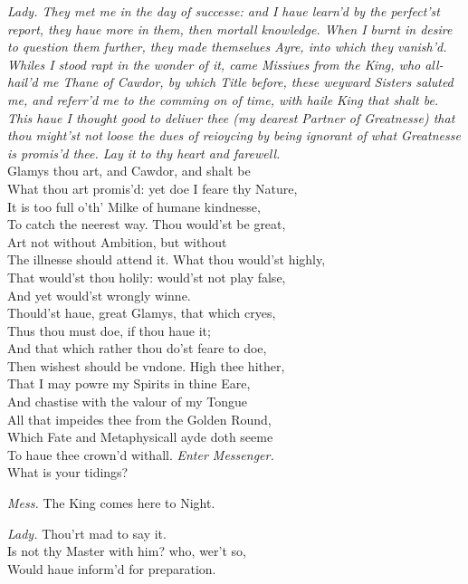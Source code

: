 \documentclass[12pt]{sides}
\newcommand{\clStageDir}[1]{\hspace*{\fill}\textit{#1}\hspace*{\fill}}
\newcommand{\dia}[1]{\hskip 15pt\textit{#1}\hskip 6pt}
\begin{document}
\begin{multicols}{2}
            \dia{\textnormal{Lady.} They met me in the day of successe: and I haue learn'd by the perfect'st report, they haue more in them, then mortall knowledge. When I burnt in desire to question them further, they made themselues Ayre, into which they vanish'd. Whiles I stood rapt in the wonder of it, came Missiues from the King, who all-hail'd me Thane of Cawdor, by which Title before, these weyward Sisters saluted me, and referr'd me to the comming on of time, with haile King that shalt be. This haue I thought good to deliuer thee (my dearest Partner of Greatnesse) that thou might'st not loose the dues of reioycing by being ignorant of what Greatnesse is promis'd thee. Lay it to thy heart and farewell.} \\ Glamys thou art, and Cawdor, and shalt be \\ What thou art promis'd: yet doe I feare thy Nature, \\ It is too full o'th' Milke of humane kindnesse, \\ To catch the neerest way. Thou would'st be great, \\ Art not without Ambition, but without \\ The illnesse should attend it. What thou would'st highly, \\ That would'st thou holily: would'st not play false, \\ And yet would'st wrongly winne. \\ Thould'st haue, great Glamys, that which cryes, \\ Thus thou must doe, if thou haue it; \\ And that which rather thou do'st feare to doe, \\ Then wishest should be vndone. High thee hither, \\ That I may powre my Spirits in thine Eare, \\ And chastise with the valour of my Tongue \\ All that impeides thee from the Golden Round, \\ Which Fate and Metaphysicall ayde doth seeme \\ To haue thee crown'd withall. \clStageDir{Enter Messenger.} \\ What is your tidings?

            \dia{Mess.} The King comes here to Night.

            \dia{Lady.} Thou'rt mad to say it. \\ Is not thy Master with him? who, wer't so, \\ Would haue inform'd for preparation.


\end{multicols}
\end{document}
